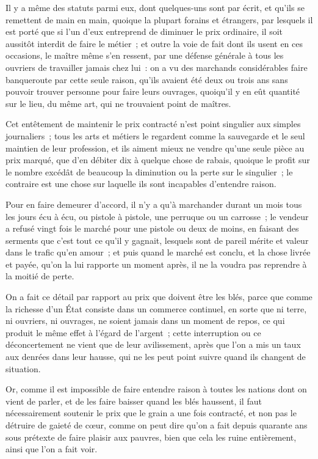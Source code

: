\documentclass[french,twoside]{book} %
\begin{document}
Il y a même des statuts parmi eux, dont quelques-uns sont par écrit, et qu’ils se remettent de main en main, quoique la plupart forains et étrangers, par lesquels il est porté que si l’un d’eux entreprend de diminuer le prix ordinaire, il soit aussitôt interdit de faire le métier ; et outre la voie de fait dont ils usent en ces occasions, le maître même s’en ressent, par une défense générale à tous les ouvriers de travailler jamais chez lui : on a vu des marchands considérables faire banqueroute par cette seule raison, qu’ils avaient été deux ou trois ans sans pouvoir trouver personne pour faire leurs ouvrages, quoiqu’il y en eût quantité sur le lieu, du même art, qui ne trouvaient point de maîtres.\par
Cet entêtement de maintenir le prix contracté n’est point singulier aux simples journaliers ; tous les arts et métiers le regardent comme la sauvegarde et le seul maintien de leur profession, et ils aiment mieux ne vendre qu’une seule pièce au prix marqué, que d’en débiter dix à quelque chose de rabais, quoique le profit sur le nombre excédât de beaucoup la diminution ou la perte sur le singulier ; le contraire est une chose sur laquelle ils sont incapables d’entendre raison.\par
Pour en faire demeurer d’accord, il n’y a qu’à marchander durant un mois tous les jours écu à écu, ou pistole à pistole, une perruque ou un carrosse ; le vendeur a refusé vingt fois le marché pour une pistole ou deux de moins, en faisant des serments que c’est tout ce qu’il y gagnait, lesquels sont de pareil mérite et valeur dans le trafic qu’en amour ; et puis quand le marché est conclu, et la chose livrée et payée, qu’on la lui rapporte un moment après, il ne la voudra pas reprendre à la moitié de perte.\par
On a fait ce détail par rapport au prix que doivent être les blés, parce que comme la richesse d’un État consiste dans un commerce continuel, en sorte que ni terre, ni ouvriers, ni ouvrages, ne soient jamais dans un moment de repos, ce qui produit le même effet à l’égard de l’argent ; cette interruption ou ce déconcertement ne vient que de leur avilissement, après que l’on a mis un taux aux denrées dans leur hausse, qui ne les peut point suivre quand ils changent de situation.\par
Or, comme il est impossible de faire entendre raison à toutes les nations dont on vient de parler, et de les faire baisser quand les blés haussent, il faut nécessairement soutenir le prix que le grain a une fois contracté, et non pas le détruire de gaieté de cœur, comme on peut dire qu’on a fait depuis quarante ans sous prétexte de faire plaisir aux pauvres, bien que cela les ruine entièrement, ainsi que l’on a fait voir.\par
\end{document}
